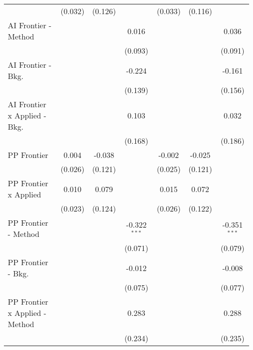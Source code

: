 \begin{tabular}{lcccccc}
                                  & (0.032) & (0.126)      &                & (0.033)      & (0.116)      &   \\   
   AI Frontier - Method           &         &              & 0.016          &              &              & 0.036\\   
                                  &         &              & (0.093)        &              &              & (0.091)\\   
   AI Frontier - Bkg.             &         &              & -0.224         &              &              & -0.161\\   
                                  &         &              & (0.139)        &              &              & (0.156)\\   
   AI Frontier x Applied - Bkg.   &         &              & 0.103          &              &              & 0.032\\   
                                  &         &              & (0.168)        &              &              & (0.186)\\   
   PP Frontier                    & 0.004   & -0.038       &                & -0.002       & -0.025       &   \\   
                                  & (0.026) & (0.121)      &                & (0.025)      & (0.121)      &   \\   
   PP Frontier x Applied          & 0.010   & 0.079        &                & 0.015        & 0.072        &   \\   
                                  & (0.023) & (0.124)      &                & (0.026)      & (0.122)      &   \\   
   PP Frontier - Method           &         &              & -0.322$^{***}$ &              &              & -0.351$^{***}$\\   
                                  &         &              & (0.071)        &              &              & (0.079)\\   
   PP Frontier - Bkg.             &         &              & -0.012         &              &              & -0.008\\   
                                  &         &              & (0.075)        &              &              & (0.077)\\   
   PP Frontier x Applied - Method &         &              & 0.283          &              &              & 0.288\\   
                                  &         &              & (0.234)        &              &              & (0.235)\\   

\end{tabular}
